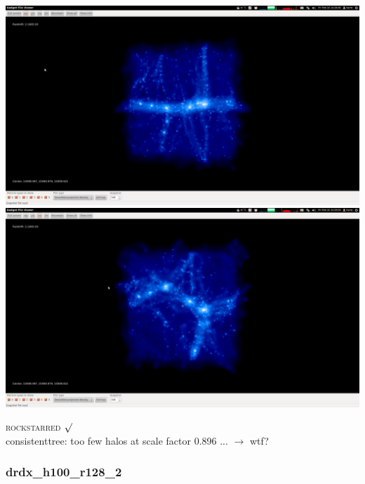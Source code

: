 \documentclass[a4paper,11pt,fleqn,oneside]{book}
\begin{document}
\includegraphics[scale=0.12]{drdx_h100_r128_1/1.png} 
\includegraphics[scale=0.12]{drdx_h100_r128_1/2.png} 

\textsc{rockstarred} $\surd$  \\
consistenttree: too few halos at scale factor 0.896 ... $\rightarrow$ wtf? 

\newpage
\subsubsection{drdx\_h100\_r128\_2}
\end{document}
